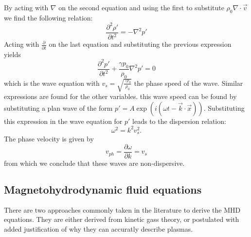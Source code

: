 {\centering 
\noindent {}
\par}
By acting with $\nabla$ on the second equation and using the first to substitute $\rho_0 \nabla \cdot \vec{v}$ we find the following relation:
\begin{equation*}
	\frac{\partial^2 \rho'}{\partial t^2} = -\nabla^2 p'
\end{equation*}
Acting with $ \frac{\partial}{\partial t}$ on the last equation and substituting the previous expression yields
\begin{equation*}
	\frac{\partial^2 p'}{\partial t^2} + \frac{\gamma p_0}{\rho_0} \nabla^2 p' = 0
\end{equation*}
which is the wave equation with $v_s = \sqrt{ \frac{\gamma p_0}{\rho_0} }$ the phase speed of the wave.
Similar expressions are found for the other variables. 
this wave speed can be found by substituting a plan wave of the form $p' = A \exp \left( i(\omega t - \vec{k}\cdot\vec{x}) \right) $. Substituting this expression in the wave equation for $p'$ leads to the dispersion relation:
\begin{equation}
	\omega^2 = k^2v_s^2.
\end{equation}
The phase velocity is given by
\begin{equation}
	v_{ph} = \frac{\partial \omega}{\partial k} = v_s
\end{equation}
from which we conclude that these waves are non-dispersive.

\subsection{Magnetohydrodynamic fluid equations}
There are two approaches commonly taken in the literature to derive the MHD equations. They are either derived from kinetic gass theory, or postulated with added justification of why they can accuratly describe plasmas.

